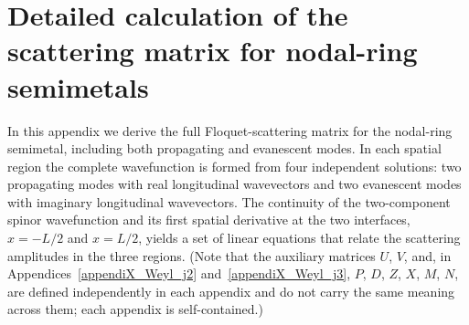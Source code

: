 \documentclass[aps,prb,onecolumn,longbibliography,nofootinbib,citeautoscript,10pt]{revtex4-2}
\begin{document}
\section{Detailed calculation of the scattering matrix for nodal-ring semimetals}
\label{appendiX_nodal_two}

In this appendix we derive the full Floquet-scattering matrix for the nodal-ring semimetal, including both propagating and evanescent modes. In each spatial region the complete wavefunction is formed from four independent solutions: two propagating modes with real longitudinal wavevectors and two evanescent modes with imaginary longitudinal wavevectors. The continuity of the two-component spinor wavefunction and its first spatial derivative at the two interfaces, $x=-L/2$ and $x=L/2$, yields a set of linear equations that relate the scattering amplitudes in the three regions. (Note that the auxiliary matrices $U$, $V$, and, in Appendices~\ref{appendiX_Weyl_j2} and~\ref{appendiX_Weyl_j3}, $P$, $D$, $Z$, $X$, $M$, $N$, are defined independently in each appendix and do not carry the same meaning across them; each appendix is self-contained.)
\end{document}
